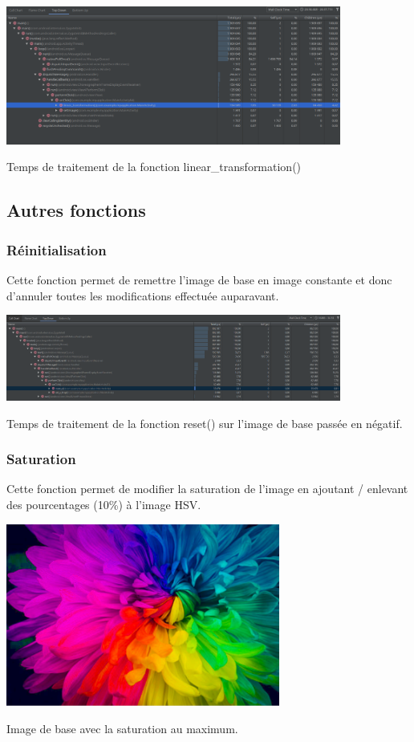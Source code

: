 \documentclass{article}
\begin{document}
\begin{center} 
    \includegraphics[width=11cm]{../Image_temps/TempsLinearTransformation}

    Temps de traitement de la fonction linear\_transformation()
\end{center}
\bigbreak

\subsection{Autres fonctions}

\subsubsection{Réinitialisation}
Cette fonction permet de remettre l'image de base en image constante et donc d'annuler toutes les modifications effectuée auparavant.
\bigbreak

\begin{center} 
    \includegraphics[width=11cm]{../Image_temps/TempsReset}

    Temps de traitement de la fonction reset() sur l'image de base passée en négatif.
\end{center}
\bigbreak

\subsubsection{Saturation}
Cette fonction permet de modifier la saturation de l'image en ajoutant / enlevant des pourcentages (10\%) à l'image HSV.
\bigbreak

\begin{center} 
    \includegraphics[width=9cm]{../Image_fonctions/SaturationMax}

    Image de base avec la saturation au maximum.
\end{center}
\bigbreak
\end{document}

